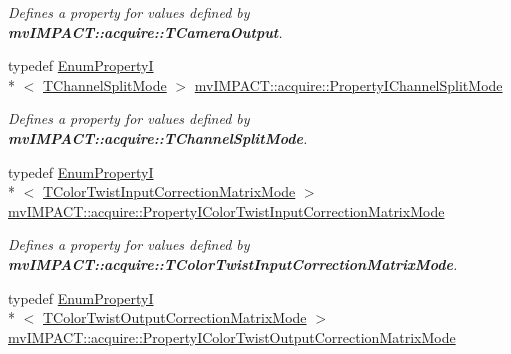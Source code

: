 \begin{DoxyCompactItemize}
\begin{DoxyCompactList}\small\item\em Defines a property for values defined by {\bfseries mv\+I\+M\+P\+A\+C\+T\+::acquire\+::\+T\+Camera\+Output}. \end{DoxyCompactList}\item 
\hypertarget{group___common_interface_ga10dc070afa8c2d87bc6316c6a8507e82}{typedef \hyperlink{classmv_i_m_p_a_c_t_1_1acquire_1_1_enum_property_i}{Enum\+Property\+I}\\*
$<$ \hyperlink{group___common_interface_gae8e9f7bb0e510d844b2681642e8e46d2}{T\+Channel\+Split\+Mode} $>$ \hyperlink{group___common_interface_ga10dc070afa8c2d87bc6316c6a8507e82}{mv\+I\+M\+P\+A\+C\+T\+::acquire\+::\+Property\+I\+Channel\+Split\+Mode}}\label{group___common_interface_ga10dc070afa8c2d87bc6316c6a8507e82}

\begin{DoxyCompactList}\small\item\em Defines a property for values defined by {\bfseries mv\+I\+M\+P\+A\+C\+T\+::acquire\+::\+T\+Channel\+Split\+Mode}. \end{DoxyCompactList}\item 
\hypertarget{group___common_interface_gad8aa01209e3623c8739f5e1ded1b187d}{typedef \hyperlink{classmv_i_m_p_a_c_t_1_1acquire_1_1_enum_property_i}{Enum\+Property\+I}\\*
$<$ \hyperlink{group___common_interface_ga514bdc683ef27995fdeba04aec25f571}{T\+Color\+Twist\+Input\+Correction\+Matrix\+Mode} $>$ \hyperlink{group___common_interface_gad8aa01209e3623c8739f5e1ded1b187d}{mv\+I\+M\+P\+A\+C\+T\+::acquire\+::\+Property\+I\+Color\+Twist\+Input\+Correction\+Matrix\+Mode}}\label{group___common_interface_gad8aa01209e3623c8739f5e1ded1b187d}

\begin{DoxyCompactList}\small\item\em Defines a property for values defined by {\bfseries mv\+I\+M\+P\+A\+C\+T\+::acquire\+::\+T\+Color\+Twist\+Input\+Correction\+Matrix\+Mode}. \end{DoxyCompactList}\item 
\hypertarget{group___common_interface_gacf5323a7be006494492dd5f8c11c730e}{typedef \hyperlink{classmv_i_m_p_a_c_t_1_1acquire_1_1_enum_property_i}{Enum\+Property\+I}\\*
$<$ \hyperlink{group___common_interface_ga0892ed0e7e5949707e49bb7d584f8478}{T\+Color\+Twist\+Output\+Correction\+Matrix\+Mode} $>$ \hyperlink{group___common_interface_gacf5323a7be006494492dd5f8c11c730e}{mv\+I\+M\+P\+A\+C\+T\+::acquire\+::\+Property\+I\+Color\+Twist\+Output\+Correction\+Matrix\+Mode}}\label{group___common_interface_gacf5323a7be006494492dd5f8c11c730e}


\end{DoxyCompactItemize}

